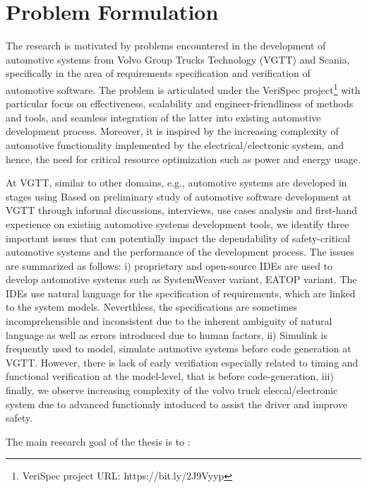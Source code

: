 \chapter{Problem Formulation}
The research is motivated by problems encountered in the development of automotive systems from Volvo Group Trucks Technology (VGTT) and Scania, specifically in the area of requirements specification and verification of automotive software. The problem is articulated under the VeriSpec project\footnote{VeriSpec project URL: https://bit.ly/2J9Vyyp} with particular focus on effectiveness, scalability and engineer-friendliness of methods and tools, and seamless integration of the latter into existing automotive development process. Moreover, it is inspired by the increasing complexity of automotive functionality implemented by the electrical/electronic system, and hence, the need for critical resource optimization such as power and energy usage.

At VGTT, similar to other domains, e.g., automotive systems are developed in stages using Based on preliminary study of automotive software development at VGTT through informal discussions, interviews, use cases analysis and first-hand experience on existing automotive systems development tools, we identify three important issues that can potentially impact the dependability of safety-critical automotive systems and the performance of the development process. The issues are  summarized as follows: i) proprietary and open-source IDEs are used to develop automotive systems such as SystemWeaver variant, EATOP variant. The IDEs use natural language for the specification of requirements, which are linked to the system models. Neverthless, the specifications are sometimes incomprehensible and inconsistent due to the inherent ambiguity of natural language as well as errors introduced due to human factors,  ii) Simulink is frequently used to model, simulate autmotive systems before code generation at VGTT. However, there is lack of early verifiation especially related to timing and functional verification at the model-level, that is before code-generation, iii) finally, we observe increasing complexity of the volvo truck eleccal/electronic system due to advanced functionaly intoduced to assist the driver and improve safety.

The main research goal of the thesis is to :
\begin{center}
\end{center}

